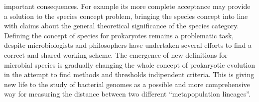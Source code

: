 important consequences. For example its more complete acceptance may provide a solution to the species concept problem, bringing the species concept into line with claims about the general theoretical significance of the species category.\\
Defining the  concept of species for prokaryotes remains a problematic task, despite microbiologists and philosophers have undertaken several efforts to find a correct and shared working scheme. The emergence of new definitions for microbial species is gradually changing the whole concept of prokaryotic evolution in the attempt to find methods and thresholds indipendent criteria. This is giving new life to the study of bacterial genomes as a possible and more comprehensive way for measuring the distance between two different ``metapopulation lineages''.\\

